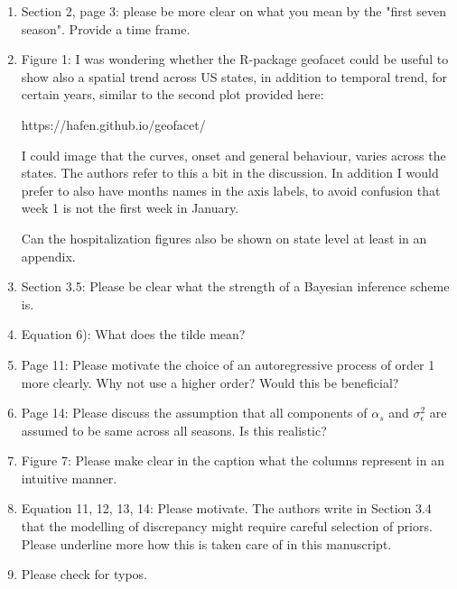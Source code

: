 \documentclass{article}
\begin{document}
\begin{enumerate}[-]

\item Section 2, page 3: please be more clear on what you mean by the 
"first seven season". Provide a time frame.

\item Figure 1: I was wondering whether the R-package geofacet could be useful to 
show also a spatial trend across US states, in addition to temporal trend, for 
certain years,  similar to the second plot provided here:

https://hafen.github.io/geofacet/

I could image that the curves, onset and general behaviour, varies across the 
states. The authors refer to this a bit in the discussion. In addition I would 
prefer to also have months names in the axis labels, to avoid confusion that 
week 1 is not the first week in January.

Can the hospitalization figures also be shown on state level at least in an appendix.

\item Section 3.5: Please be clear what the strength of a Bayesian inference scheme is. 

\item Equation 6): What does the tilde mean?

\item Page 11: Please motivate the choice of an autoregressive process of order 1 
more clearly. Why not use a higher order? Would this be beneficial?

\item Page 14: Please discuss the assumption that all components of $\alpha_s$ and 
$\sigma_\epsilon^2$ are assumed to be same across all seasons. Is this realistic?

\item Figure 7: Please make clear in the caption what the columns represent in an 
intuitive manner. 

\item Equation 11, 12, 13, 14: Please motivate. The authors write in Section 3.4 
that the modelling of discrepancy might require careful selection of priors. 
Please underline more how this is taken care of in this manuscript.

\item Please check for typos.
  
\end{enumerate}
\end{document}
